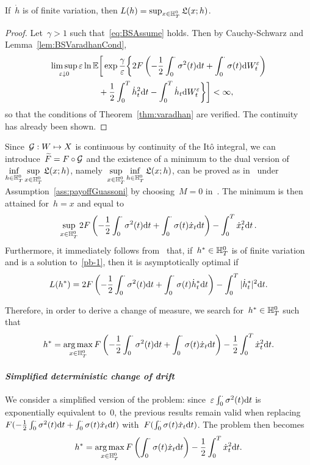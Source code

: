 \begin{lemma}
If~$\dot{h}$ is of finite variation, then 
$L(h) = \sup_{x \in \mathbb{H}_T^0}\mathfrak{L}(x;h)$.
\end{lemma}
\begin{proof}
Let~$\gamma>1$ such that~\eqref{eq:BSAssume} holds. Then by Cauchy-Schwarz and Lemma~\ref{lem:BSVaradhanCond},
\begin{align*}
\limsup\limits_{\varepsilon\downarrow 0} \varepsilon \ln\mathbb{E}&\bigg[\exp\frac{\gamma}{\varepsilon}\bigg\{2F\left(-\frac{1}{2}\int_0^\cdot \sigma^2(t)\mathrm{d} t + \int_0^\cdot \sigma(t) \mathrm{d} W_t^\varepsilon\right) \\
&+ \frac{1}{2}\int_0^T \dot{h}_t^2\mathrm{d} t - \int_0^T \dot{h}_t \mathrm{d} W_t^{\varepsilon} \bigg\}\bigg] <\infty,
\end{align*}
so that the conditions of Theorem~\ref{thm:varadhan} are verified.
The continuity has already been shown.
\end{proof}
Since~$\mathcal{G}: W\mapsto X$ is continuous by continuity of the It\^{o} integral, we can introduce~$\widetilde F =\nobreak F\circ\mathcal{G}$ and the existence of a minimum to the dual version of 
$\inf\limits_{h \in \mathbb{H}_T^0} \sup\limits_{x \in \mathbb{H}_T^0} \mathfrak{L}(x;h)$,
namely~$\sup\limits_{x \in \mathbb{H}_T^0} \inf\limits_{h \in \mathbb{H}_T^0}\mathfrak{L}(x;h)$,
can be proved as in~\cite{Guasoni2007OptimalTime} under Assumption~\ref{ass:payoffGuassoni} by choosing~$M=0$ in~\cite[Lemma~7.1]{Guasoni2007OptimalTime}. 
The minimum is then attained  for~$h=x$ and equal to 
\begin{equation}\label{pb-1}
    \sup\limits_{x \in \mathbb{H}_T^0}2F\left(-\frac{1}{2}\int_0^\cdot \sigma^2(t)\mathrm{d} t + \int_0^\cdot \sigma(t) \dot{x}_t \mathrm{d} t\right)
 - \int_0^T \dot{x}_t^2 \mathrm{d} t\,.
\end{equation}
Furthermore, it immediately follows from~\cite[Theorem~3.6]{Guasoni2007OptimalTime} that, if~$h^*\in \mathbb{H}_T^0$ is of finite variation and is a solution to~\eqref{pb-1}, then it is asymptotically optimal if
$$
L(h^{*}) = 2F\left(-\frac{1}{2}\int_0^\cdot \sigma^2(t)\mathrm{d} t + \int_0^\cdot \sigma(t) \dot{h}^{*}_t \mathrm{d} t\right) - \int_0^T |\dot{h}^{*}_t|^2 \mathrm{d} t.
$$

Therefore, in order to derive a change of measure, we search for~$h^{*} \in \mathbb{H}_T^0$ such that
$$
h^{*} = \operatorname*{arg\,max}\limits_{x \in \mathbb{H}_T^0}F\left(-\frac{1}{2}\int_0^\cdot \sigma^2(t)\mathrm{d} t + \int_0^\cdot \sigma(t) \dot{x}_t \mathrm{d} t\right)
 - \frac{1}{2}\int_0^T \dot{x}_t^2 \mathrm{d} t.
$$

\paragraph{\textit{Simplified deterministic change of drift}}
We consider a simplified version of the problem:
since~$\varepsilon\int_0^\cdot\sigma^2(t)\mathrm{d} t$ is exponentially equivalent to~$0$, the previous results remain valid 
when replacing~$F(-\frac{1}{2}\int_0^\cdot \sigma^2(t)\mathrm{d} t + \int_0^\cdot \sigma(t) \dot{x}_t \mathrm{d} t)$ with~$F(\int_0^\cdot \sigma(t) \dot{x}_t \mathrm{d} t)$. 
The problem then becomes
$$
h^{*} = \operatorname*{arg\,max}\limits_{x \in \mathbb{H}_T^0} F\left(\int_0^\cdot \sigma(t) \dot{x}_t \mathrm{d} t\right) - \frac{1}{2}\int_0^T \dot{x}_t^2 \mathrm{d} t.
$$

